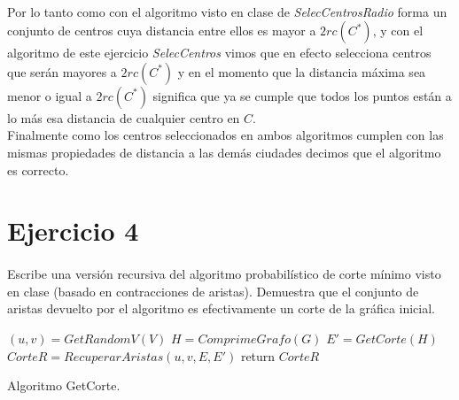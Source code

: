 \documentclass[12pt]{article}
\begin{document}
	\paragraph{} Por lo tanto como con el algoritmo visto en clase de \textit{SelecCentrosRadio} forma un conjunto de centros cuya distancia entre ellos es mayor a $2rc(C^*)$, y con el algoritmo de este ejercicio \textit{SelecCentros} vimos que en efecto selecciona centros que serán mayores a $2rc(C^*)$ y en el momento que la distancia máxima sea menor o igual a $2rc(C^*)$ significa que ya se cumple que todos los puntos están a lo más esa distancia de cualquier centro en $C$.\\
	Finalmente como los centros seleccionados en ambos algoritmos cumplen con las mismas propiedades de distancia a las demás ciudades decimos que el algoritmo es correcto.
\section{Ejercicio 4}
\paragraph{} Escribe una versión recursiva del algoritmo probabilístico de corte mínimo visto en clase (basado en contracciones de aristas). Demuestra que el conjunto de aristas devuelto por el algoritmo es efectivamente un corte de la gráfica inicial.\\
\begin{algorithm}[H]
	\SetAlgoLined
	$(u,v)=GetRandomV(V)$\;
	$H=ComprimeGrafo(G)$\;
	$E' = GetCorte(H)$\;
	$CorteR = RecuperarAristas(u,v,E,E')$\;
	return $CorteR$\;
	\caption{Algoritmo GetCorte.}
\end{algorithm}
\end{document}
